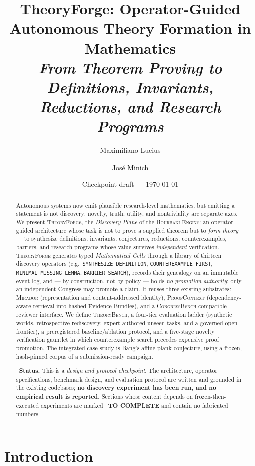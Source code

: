 \documentclass[11pt]{amsart}
\title[TheoryForge]{TheoryForge: Operator-Guided Autonomous Theory
Formation in Mathematics\\[2pt]
\normalsize\itshape From Theorem Proving to Definitions, Invariants,
Reductions, and Research Programs}
\author{Maximiliano Lucius}
\author{Jos\'e Minich}
\date{Checkpoint draft --- \today}
\theoremstyle{definition}
\theoremstyle{remark}
\newcommand{\engine}{\textsc{Bourbaki Engine}}
\newcommand{\mirador}{\textsc{Mirador}}
\newcommand{\pc}{\textsc{ProofContext}}
\newcommand{\cb}{\textsc{CongressBench}}
\newcommand{\tf}{\textsc{TheoryForge}}
\newcommand{\tb}{\textsc{TheoryBench}}
\newcommand{\op}[1]{\texttt{#1}}
\begin{document}
\begin{abstract}
Autonomous systems now emit plausible research-level mathematics, but emitting a
statement is not discovery: novelty, truth, utility, and nontriviality are
separate axes. We present \tf{}, the \emph{Discovery Plane} of the \engine{}:
an operator-guided architecture whose task is not to prove a supplied theorem
but to \emph{form theory} --- to synthesize definitions, invariants,
conjectures, reductions, counterexamples, barriers, and research programs whose
value survives \emph{independent} verification. \tf{} generates typed
\emph{Mathematical Cells} through a library of thirteen discovery operators
(e.g.\ \op{SYNTHESIZE\_DEFINITION}, \op{COUNTEREXAMPLE\_FIRST},
\op{MINIMAL\_MISSING\_LEMMA}, \op{BARRIER\_SEARCH}), records their genealogy on
an immutable event log, and --- by construction, not by policy --- holds
\emph{no promotion authority}: only an independent Congress may promote a claim.
It reuses three existing substrates: \mirador{} (representation and
content-addressed identity), \pc{} (dependency-aware retrieval into hashed
Evidence Bundles), and a \cb{}-compatible reviewer interface. We define \tb{},
a four-tier evaluation ladder (synthetic worlds, retrospective rediscovery,
expert-authored unseen tasks, and a governed open frontier), a preregistered
baseline/ablation protocol, and a five-stage novelty--verification gauntlet in
which counterexample search precedes expensive proof promotion. The integrated
case study is Bang's affine plank conjecture, using a frozen, hash-pinned corpus
of a submission-ready campaign.

\medskip
\noindent\dbend~\textbf{Status.} This is a \emph{design and protocol checkpoint}.
The architecture, operator specifications, benchmark design, and evaluation
protocol are written and grounded in the existing codebases; \textbf{no
discovery experiment has been run, and no empirical result is reported.}
Sections whose content depends on frozen-then-executed experiments are marked
\dbend~\textbf{TO COMPLETE} and contain no fabricated numbers.
\end{abstract}

\maketitle

\tableofcontents

\section{Introduction}\label{sec:intro}
\end{document}
